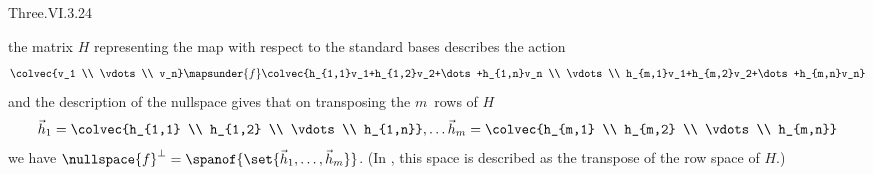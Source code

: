 \begin{ans}{Three.VI.3.24}
\begin{exparts}
           the matrix $H$ representing the map with respect to the standard
           bases describes the action
           \begin{equation*}
             \colvec{v_1 \\ \vdots \\ v_n}
             \mapsunder{f}
             \colvec{h_{1,1}v_1+h_{1,2}v_2+\dots+h_{1,n}v_n \\
                     \vdots                                 \\
                     h_{m,1}v_1+h_{m,2}v_2+\dots+h_{m,n}v_n}
           \end{equation*}
           and the description of the nullspace gives that
           on transposing the $m$~rows of $H$
           \begin{equation*}
             \vec{h}_1=\colvec{h_{1,1} \\ h_{1,2} \\ \vdots \\ h_{1,n}},
              \dots
             \vec{h}_m=\colvec{h_{m,1} \\ h_{m,2} \\ \vdots \\ h_{m,n}}
           \end{equation*}
           we have $\nullspace{f}^\perp
                    =\spanof{\set{\vec{h}_1,\dots,\vec{h}_m}}$.
           (In \cite{Strang93}, this space is described as the
           transpose of the row space of $H$.)
      \end{exparts}
    
\end{ans}
